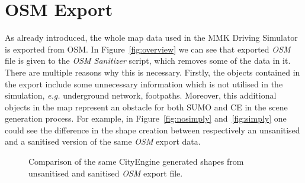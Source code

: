 \section{OSM Export}
As already introduced, the whole map data used in the MMK Driving Simulator is exported from OSM. In Figure~\ref{fig:overview} we can see that exported \emph{OSM} file is given to the \emph{OSM Sanitizer} script, which removes some of the data in it. There are multiple reasons why this is necessary. Firstly, the objects contained in the export include some unnecessary information which is not utilised in the simulation, \emph{e.g.} underground network, footpaths. Moreover, this additional objects in the map represent an obstacle for both SUMO and CE in the scene generation process. For example, in Figure~\ref{fig:nosimply} and~\ref{fig:simply} one could see the difference in the shape creation between respectively an unsanitised and a sanitised version of the same \emph{OSM} export data.  

\begin{figure}[htb]
	\centering
	\hspace{0.05\textwidth}%
	\caption{Comparison of the same CityEngine generated shapes from unsanitised and sanitised \emph{OSM} export file.}
\end{figure}

